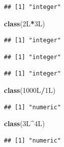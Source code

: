 \documentclass[]{book}
\newenvironment{Shaded}{\begin{snugshade}}{\end{snugshade}}
\newcommand{\KeywordTok}[1]{\textcolor[rgb]{0.13,0.29,0.53}{\textbf{#1}}}
\newcommand{\NormalTok}[1]{#1}
\newcommand{\OperatorTok}[1]{\textcolor[rgb]{0.81,0.36,0.00}{\textbf{#1}}}
\begin{document}
\begin{verbatim}
## [1] "integer"
\end{verbatim}

\begin{Shaded}
\begin{Highlighting}[]
\KeywordTok{class}\NormalTok{(2L}\OperatorTok{*}\NormalTok{3L)}
\end{Highlighting}
\end{Shaded}

\begin{verbatim}
## [1] "integer"
\end{verbatim}

\begin{Shaded}
\end{Shaded}

\begin{verbatim}
## [1] "integer"
\end{verbatim}

\begin{Shaded}
\end{Shaded}

\begin{verbatim}
## [1] "integer"
\end{verbatim}

\begin{Shaded}
\begin{Highlighting}[]
\KeywordTok{class}\NormalTok{(1000L}\OperatorTok{/}\NormalTok{1L)}
\end{Highlighting}
\end{Shaded}

\begin{verbatim}
## [1] "numeric"
\end{verbatim}

\begin{Shaded}
\begin{Highlighting}[]
\KeywordTok{class}\NormalTok{(3L}\OperatorTok{^}\NormalTok{4L)}
\end{Highlighting}
\end{Shaded}

\begin{verbatim}
## [1] "numeric"
\end{verbatim}
\end{document}
